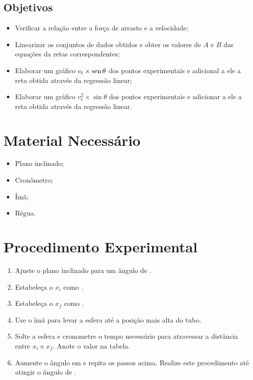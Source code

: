 \subsection{Objetivos}

\begin{itemize}
     \item Verificar a relação entre a força de arrasto e a velocidade;
	 \item Linearizar os conjuntos de dados obtidos e obter os valores de $A$ e $B$ das equações da retas correspondentes;
     \item Elaborar um gráfico $v_t \times \operatorname{sen}\theta$ dos pontos experimentais e adicional a ele a reta obtida através da regressão linear;
	 \item Elaborar um gráfico $v_t^2 \times \sin\theta$ dos pontos experimentais e adicionar a ele a reta obtida através da regressão linear.
\end{itemize}

\section{Material Necessário}

\begin{itemize}
	\item Plano inclinado;
	\item Cronômetro;
	\item Ímã;
	\item Régua.
\end{itemize}

\section{Procedimento Experimental}

\begin{enumerate}
	\item Ajuste o plano inclinado para um ângulo de .
	\item Estabeleça o $x_i$ como .
	\item Estabeleça o $x_f$ como .
	\item Use o ímã para levar a esfera até a posição mais alta do tubo.
	\item Solte a esfera e cronometre o tempo necessário para atravessar a distância entre $x_i$ e $x_f$. Anote o valor na tabela.
	\item Aumente o ângulo em  e repita os passos acima. Realize este procedimento até atingir o ângulo de .
\end{enumerate}

